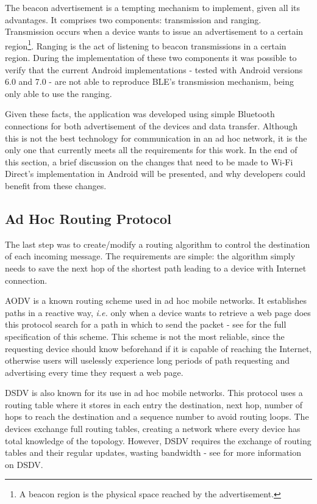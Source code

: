 The beacon advertisement is a tempting mechanism to implement, given all its advantages. It comprises two components: transmission and ranging. Transmission occurs when a device wants to issue an advertisement to a certain region\footnote{A beacon region is the physical space reached by the advertisement.}. Ranging is the act of listening to beacon transmissions in a certain region. During the implementation of these two components it was possible to verify that the current Android implementations - tested with Android versions 6.0 and 7.0 - are not able to reproduce \gls{BLE}'s transmission mechanism, being only able to use the ranging.

Given these facts, the application was developed using simple Bluetooth connections for both advertisement of the devices and data transfer. Although this is not the best technology for communication in an ad hoc network, it is the only one that currently meets all the requirements for this work. In the end of this section, a brief discussion on the changes that need to be made to Wi-Fi Direct's implementation in Android will be presented, and why developers could benefit from these changes.

\subsection{Ad Hoc Routing Protocol}
\label{subsec:routprot}

The last step was to create/modify a routing algorithm to control the destination of each incoming message. The requirements are simple: the algorithm simply needs to save the next hop of the shortest path leading to a device with Internet connection.

\gls{AODV} is a known routing scheme used in ad hoc mobile networks. It establishes paths in a reactive way, \textit{i.e.} only when a device wants to retrieve a web page does this protocol search for a path in which to send the packet - see \cite{aodv} for the full specification of this scheme. This scheme is not the most reliable, since the requesting device should know beforehand if it is capable of reaching the Internet, otherwise users will uselessly experience long periods of path requesting and advertising every time they request a web page.

\gls{DSDV} is also known for its use in ad hoc mobile networks. This protocol uses a routing table where it stores in each entry the destination, next hop, number of hops to reach the destination and a sequence number to avoid routing loops. The devices exchange full routing tables, creating a network where every device has total knowledge of the topology. However, \gls{DSDV} requires the exchange of routing tables and their regular updates, wasting bandwidth - see \cite{dsdv} for more information on \gls{DSDV}.

